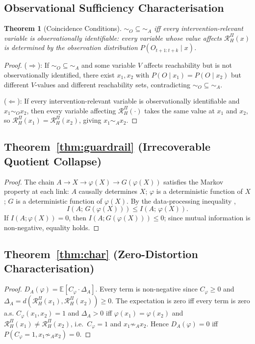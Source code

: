 \documentclass[10pt,twocolumn]{article}
\theoremstyle{plain}
\newtheorem{theorem}{Theorem}
\theoremstyle{definition}
\theoremstyle{remark}
\newcommand{\simA}{\sim_{\!A}}
\newcommand{\simO}{\sim_{\!O}}
\newcommand{\RHP}{\mathcal{R}_{H}^{\Pi}}
\newcommand{\DA}{D_{A}(\varphi)}
\begin{document}
\subsection*{Observational Sufficiency Characterisation}

\begin{theorem}[Coincidence Conditions]
\label{thm:obs_suff}
${\simO}\subseteq{\simA}$ iff every intervention-relevant variable is
observationally identifiable: every variable whose value affects $\RHP(x)$
is determined by the observation distribution $P(O_{t+1:t+k}\mid x)$.
\end{theorem}

\begin{proof}
($\Rightarrow$): If ${\simO}\subseteq{\simA}$ and some variable $V$ affects
reachability but is not observationally identified, there exist $x_1,x_2$ with
$P(O\mid x_1)=P(O\mid x_2)$ but different $V$-values and different reachability
sets, contradicting ${\simO}\subseteq{\simA}$.

($\Leftarrow$): If every intervention-relevant variable is observationally
identifiable and $x_1\simO x_2$, then every variable affecting $\RHP(\cdot)$
takes the same value at $x_1$ and $x_2$, so $\RHP(x_1)=\RHP(x_2)$, giving
$x_1\simA x_2$.
\end{proof}

\subsection*{Theorem~\ref{thm:guardrail} (Irrecoverable Quotient Collapse)}

\begin{proof}
The chain $A\to X\to\varphi(X)\to G(\varphi(X))$ satisfies the Markov property
at each link: $A$ causally determines $X$; $\varphi$ is a deterministic function
of $X$; $G$ is a deterministic function of $\varphi(X)$. By the data-processing
inequality \citep{cover2006elements},
\[
  I(A;\,G(\varphi(X)))\leq I(A;\,\varphi(X)).
\]
If $I(A;\varphi(X))=0$, then $I(A;G(\varphi(X)))\leq 0$; since mutual
information is non-negative, equality holds.
\end{proof}

\subsection*{Theorem~\ref{thm:char} (Zero-Distortion Characterisation)}

\begin{proof}
$\DA=\mathbb{E}[C_\varphi\cdot\Delta_A]$. Every term is non-negative since
$C_\varphi\geq 0$ and $\Delta_A=d(\RHP(x_1),\RHP(x_2))\geq 0$. The expectation
is zero iff every term is zero a.s. $C_\varphi(x_1,x_2)=1$ and $\Delta_A>0$ iff
$\varphi(x_1)=\varphi(x_2)$ and $\RHP(x_1)\neq\RHP(x_2)$, i.e.\ $C_\varphi=1$
and $x_1\not\simA x_2$. Hence $\DA=0$ iff $P(C_\varphi=1,x_1\not\simA x_2)=0$.
\end{proof}
\end{document}
